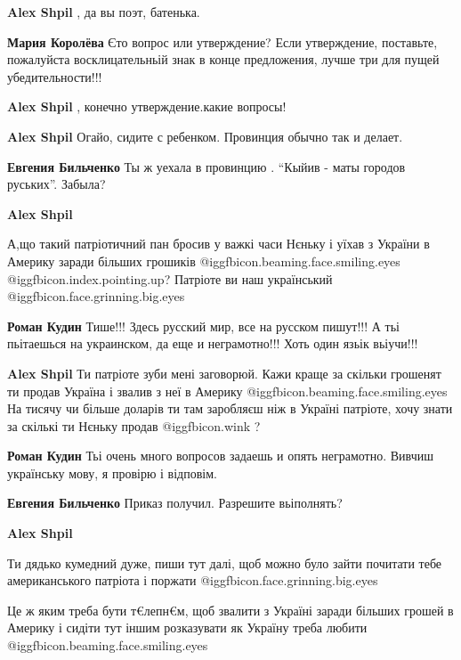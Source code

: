\begin{itemize}
\begin{itemize} %
\textbf{Alex Shpil} , да вы поэт, батенька.

\textbf{Мария Королёва} Єто вопрос или утверждение? Если утверждение, поставьте, пожалуйста восклицательньій знак в конце предложения, лучше три для пущей убедительности!!!

\textbf{Alex Shpil} , конечно утверждение.какие вопросы!


\textbf{Alex Shpil} Огайо, сидите с ребенком. Провинция обычно так и делает.

\textbf{Евгения Бильченко} Ты ж уехала в провинцию . \enquote{Кыйив - маты городов руських}. Забыла?

\textbf{Alex Shpil} 

А,що такий патріотичний пан бросив у важкі часи Нєньку і уїхав з України в
Америку заради більших грошиків @igg{fbicon.beaming.face.smiling.eyes} @igg{fbicon.index.pointing.up}?  Патріоте ви наш український @igg{fbicon.face.grinning.big.eyes} 

\textbf{Роман Кудин} Тише!!! Здесь русский мир, все на русском пишут!!! А тьі пьітаешься на украинском, да еще и неграмотно!!! Хоть один язьік вьіучи!!!

\textbf{Alex Shpil} Ти патріоте зуби мені заговорюй.
Кажи краще за скільки грошенят ти продав Україна і звалив з неї в Америку @igg{fbicon.beaming.face.smiling.eyes} 
На тисячу чи більше доларів ти там заробляєш ніж в Україні патріоте, хочу знати за скількі ти Нєньку продав @igg{fbicon.wink} ?

\textbf{Роман Кудин} Тьі очень много вопросов задаешь и опять неграмотно. Вивчиш українську мову, я провірю і відповім.

\textbf{Евгения Бильченко} Приказ получил. Разрешите вьіполнять?

\textbf{Alex Shpil} 

Ти дядько кумедний дуже, пиши тут далі, щоб можно було зайти почитати тебе
американського патріота і поржати @igg{fbicon.face.grinning.big.eyes} 

Це ж яким треба бути т€лепн€м, щоб звалити з Україні заради більших грошей в
Америку і сидіти тут іншим розказувати як Україну треба любити @igg{fbicon.beaming.face.smiling.eyes} 




\end{itemize}
\end{itemize}
